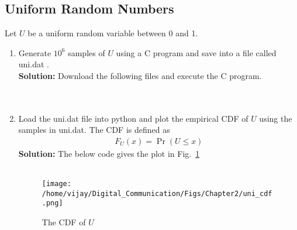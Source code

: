 \documentclass[journal,10pt,twocolumn]{IEEEtran}
\newcounter{Chapcounter}
\numberwithin{equation}{subsection}
\numberwithin{figure}{subsection}
\renewcommand\thesection{\theChapcounter.\arabic{section}}
\newcommand\figref{Fig.~\ref}
\providecommand{\pr}[1]{\ensuremath{\Pr\left(#1\right)}}
\newcommand{\solution}{\noindent \textbf{Solution: }}
\renewcommand\thesection{\arabic{section}}
\renewcommand\thesubsection{\thesection.\arabic{subsection}}
\begin{document}
\subsection{\textbf{Uniform Random Numbers}}
Let $U$ be a uniform random variable between 0 and 1.
\begin{enumerate}[label=\thesubsection.\arabic*,ref=\thesubsection.\arabic{figure}]%
\item
Generate $10^6$ samples of $U$ using a C program and save into a file called uni.dat .
\\
\solution Download the following files and execute the  C program.\\
\\
\

\item
Load the uni.dat file into python and plot the empirical CDF of $U$ using the samples in uni.dat. The CDF is defined as
\begin{align}
F_{U}(x) = \pr{U \le x}
\end{align}
\solution  The below code gives the plot in \figref{fig:uni_cdf}\\
\

\begin{figure}[!ht]
\centering
\texttt{[image: /home/vijay/Digital\_Communication/Figs/Chapter2/uni\_cdf.png]}
\caption{The CDF of $U$}
\label{fig:uni_cdf}
\end{figure}


\end{enumerate}
\end{document}
